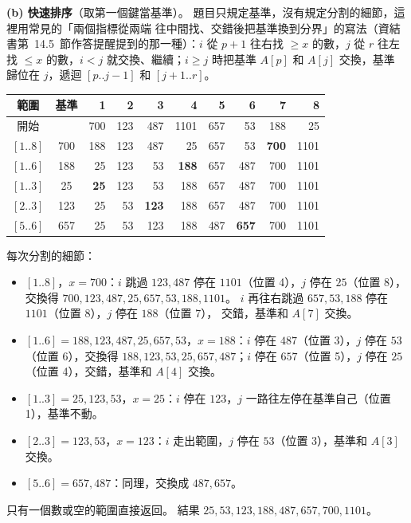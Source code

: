 \begin{pastsoln}
\textbf{(b) 快速排序}（取第一個鍵當基準）。 題目只規定基準，沒有規定分割的細節，這裡用常見的「兩個指標從兩端
往中間找、交錯後把基準換到分界」的寫法（資結書第~14.5~節作答提醒提到的那一種）：$i$ 從 $p + 1$ 往右找
$\ge x$ 的數，$j$ 從 $r$ 往左找 $\le x$ 的數，$i < j$ 就交換、繼續；$i \ge j$ 時把基準 $A[p]$ 和 $A[j]$ 交換，基準
歸位在 $j$，遞迴 $[p..j-1]$ 和 $[j+1..r]$。

\begin{center}
\small
\begin{tabular}{cc*{8}{r}}
\toprule
範圍 & 基準 & 1 & 2 & 3 & 4 & 5 & 6 & 7 & 8 \\
\midrule
開始 & & 700 & 123 & 487 & 1101 & 657 & 53 & 188 & 25 \\
$[1..8]$ & 700 & 188 & 123 & 487 & 25 & 657 & 53 & \textbf{700} & 1101 \\
$[1..6]$ & 188 & 25 & 123 & 53 & \textbf{188} & 657 & 487 & 700 & 1101 \\
$[1..3]$ & 25 & \textbf{25} & 123 & 53 & 188 & 657 & 487 & 700 & 1101 \\
$[2..3]$ & 123 & 25 & 53 & \textbf{123} & 188 & 657 & 487 & 700 & 1101 \\
$[5..6]$ & 657 & 25 & 53 & 123 & 188 & 487 & \textbf{657} & 700 & 1101 \\
\bottomrule
\end{tabular}
\end{center}
每次分割的細節：
\begin{itemize}
\item $[1..8]$，$x = 700$：$i$ 跳過 $123, 487$ 停在 $1101$（位置 4），$j$ 停在 $25$（位置 8），交換得
$700, 123, 487, 25, 657, 53, 188, 1101$。 $i$ 再往右跳過 $657, 53, 188$ 停在 $1101$（位置 8），$j$ 停在 $188$（位置 7），
交錯，基準和 $A[7]$ 交換。
\item $[1..6] = 188, 123, 487, 25, 657, 53$，$x = 188$：$i$ 停在 $487$（位置 3），$j$ 停在 $53$（位置 6），交換得
$188, 123, 53, 25, 657, 487$；$i$ 停在 $657$（位置 5），$j$ 停在 $25$（位置 4），交錯，基準和 $A[4]$ 交換。
\item $[1..3] = 25, 123, 53$，$x = 25$：$i$ 停在 $123$，$j$ 一路往左停在基準自己（位置 1），基準不動。
\item $[2..3] = 123, 53$，$x = 123$：$i$ 走出範圍，$j$ 停在 $53$（位置 3），基準和 $A[3]$ 交換。
\item $[5..6] = 657, 487$：同理，交換成 $487, 657$。
\end{itemize}
只有一個數或空的範圍直接返回。 結果 $25, 53, 123, 188, 487, 657, 700, 1101$。


\end{pastsoln}
